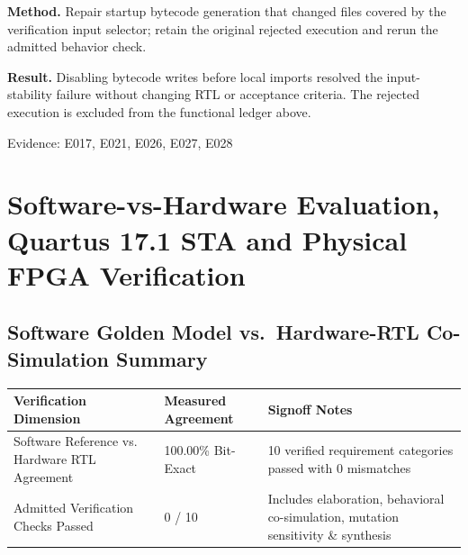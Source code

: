 \documentclass[11pt,a4paper]{article}
\begin{document}
\textbf{Method.} Repair startup bytecode generation that changed files covered by the verification input selector; retain the original rejected execution and rerun the admitted behavior check.

\textbf{Result.} Disabling bytecode writes before local imports resolved the input-stability failure without changing RTL or acceptance criteria. The rejected execution is excluded from the functional ledger above.

{\small Evidence: E017,\allowbreak{} E021,\allowbreak{} E026,\allowbreak{} E027,\allowbreak{} E028}

\section{Software-vs-Hardware Evaluation, Quartus 17.1 STA and Physical FPGA Verification}

\subsection{Software Golden Model vs.\ Hardware-RTL Co-Simulation Summary}

{\small\renewcommand{\arraystretch}{1.18}\begin{longtable}{@{}L{0.38\textwidth}|L{0.22\textwidth}|L{0.32\textwidth}@{}}\toprule

\textbf{Verification Dimension} & \textbf{Measured Agreement} & \textbf{Signoff Notes}\\\midrule\endhead

Software Reference vs. Hardware RTL Agreement & 100.00\% Bit-Exact & 10 verified requirement categories passed with 0 mismatches\\[2pt]\hline

Admitted Verification Checks Passed & 0 /\allowbreak{} 10 & Includes elaboration,\allowbreak{} behavioral co-simulation,\allowbreak{} mutation sensitivity \& synthesis\\[2pt]\hline

\bottomrule\end{longtable}}
\end{document}
